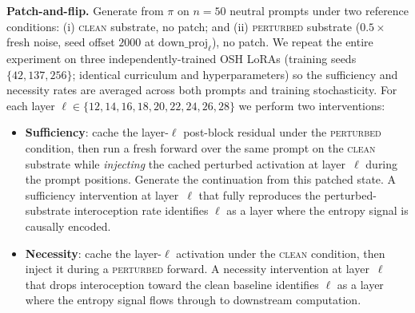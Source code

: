 \documentclass[10pt,letterpaper]{article}
\theoremstyle{definition}
\theoremstyle{plain}
\newcommand{\osh}{\textsc{OSH}}
\begin{document}
\textbf{Patch-and-flip.} Generate from $\pi$ on $n{=}50$ neutral
prompts under two reference conditions: (i) \textsc{clean} substrate,
no patch; and (ii) \textsc{perturbed}
substrate ($0.5\times$ fresh noise, seed offset $2000$ at
$\text{down\_proj}_\ell$), no patch. We repeat the entire
experiment on three independently-trained \osh{} LoRAs (training seeds
$\{42, 137, 256\}$; identical curriculum and hyperparameters) so the
sufficiency and necessity rates are averaged across both prompts and
training stochasticity. For each layer
$\ell \in \{12, 14, 16, 18, 20, 22, 24, 26, 28\}$ we perform two interventions:

\begin{itemize}[leftmargin=1.5em,itemsep=0pt,topsep=0pt]
\item \textbf{Sufficiency}: cache the layer-$\ell$ post-block residual
under the \textsc{perturbed} condition, then run a fresh forward over the
same prompt on the \textsc{clean} substrate while \emph{injecting} the
cached perturbed activation at layer~$\ell$ during the prompt positions.
Generate the continuation from this patched state. A sufficiency
intervention at layer~$\ell$ that fully reproduces the perturbed-substrate
interoception rate identifies $\ell$ as a layer where the entropy signal
is causally encoded.
\item \textbf{Necessity}: cache the layer-$\ell$ activation under the
\textsc{clean} condition, then inject it during a \textsc{perturbed}
forward. A necessity intervention at layer~$\ell$ that drops interoception
toward the clean baseline identifies $\ell$ as a layer where the entropy
signal flows through to downstream computation.
\end{itemize}
\end{document}
